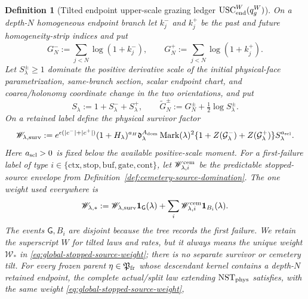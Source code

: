 \documentclass[11pt]{article}
\newtheorem{definition}[theorem]{Definition}
\newcommand{\one}{\mathbf 1}
\begin{document}
\begin{definition}[Tilted endpoint upper-scale grazing ledger
$\mathrm{USC}_{\rm end}^{W}(q_g^W)$]
\label{def:endpoint-upper-scale}
On a depth-$N$ homogeneous endpoint branch let $k_j^-$ and $k_j^+$ be the
past and future homogeneity-strip indices and put
\begin{equation}
\label{eq:homogeneity-log-marks}
 G_N^-:=\sum_{j<N}\log(1+k_j^-),\qquad
 G_N^+:=\sum_{j<N}\log(1+k_j^+).
\end{equation}
Let $S_\lambda^\pm\ge1$ dominate the positive derivative scale of the initial
physical-face parametrization, same-branch section, scalar endpoint chart,
and coarea/holonomy coordinate change in the two orientations, and put
\begin{equation}
\label{eq:augmented-homogeneity-mark}
 S_\lambda:=1+S_\lambda^-+S_\lambda^+,
 \qquad
 \widetilde G_N^\pm:=G_N^\pm+\tfrac12\log S_\lambda^\pm.
\end{equation}
On a retained label define the physical survivor factor
\begin{equation}
\label{eq:global-event-weight}
 \mathscr W_{\lambda,\rm surv}:=
 e^{\epsilon(|c^-|+|c^+|)}(1+H_\lambda)^{a_H}
 \mathfrak d_\lambda^{A_{\rm dom}}
 \operatorname{Mark}(\lambda)^2
 \{1+Z(\mathcal G_\lambda^-)+Z(\mathcal G_\lambda^+)\}
 S_\lambda^{a_{\rm scl}}.
\end{equation}
Here $a_{\rm scl}>0$ is fixed below the available positive-scale moment.
For a first-failure label of type
$i\in\{\mathrm{ctx},\mathrm{stop},\mathrm{buf},\mathrm{gate},
\mathrm{cont}\}$, let $\mathscr W_{\lambda,i}^{\rm cem}$ be the predictable
stopped-source envelope from Definition~\ref{def:cemetery-source-domination}.
The one weight used everywhere is
\begin{equation}
\label{eq:global-stopped-source-weight}
 \mathscr W_{\lambda,*}:=
 \mathscr W_{\lambda,\rm surv}\one_{\mathsf G}(\lambda)
 +\sum_i\mathscr W_{\lambda,i}^{\rm cem}\one_{B_i}(\lambda).
\end{equation}
The events $\mathsf G,B_i$ are disjoint because the tree records the first
failure.  We retain the superscript $W$ for tilted laws and rates, but it
always means the unique weight $\mathscr W_*$ in
\eqref{eq:global-stopped-source-weight}; there is no separate survivor or
cemetery tilt.
For every frozen parent $\eta\in\mathfrak P_{\rm fr}$ whose descendant
kernel contains a depth-$N$ retained endpoint, the complete actual/split law
extending $\mathrm{NST}_{\rm phys}$ satisfies, with the \emph{same} weight
\eqref{eq:global-stopped-source-weight},

\end{definition}
\end{document}
